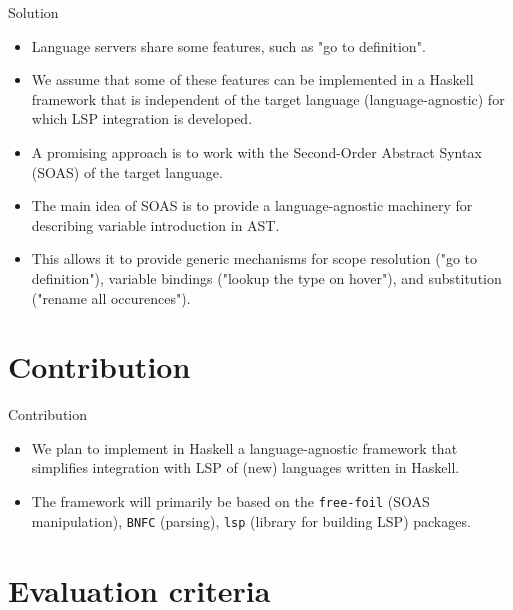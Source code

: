 \documentclass[serif, aspectratio=169]{beamer}
\begin{document}
\begin{frame}{Solution}
    \begin{itemize}
        [<+-| alert+>] %
        \item Language servers share some features, such as "go to definition".
        \item We assume that some of these features can be implemented in a Haskell framework that is independent of the target language (language-agnostic) for which LSP integration is developed.
        \item A promising approach is to work with the Second-Order Abstract Syntax (SOAS) \cite{fiore_formal_2022} of the target language.
        \item The main idea of SOAS is to provide a language-agnostic machinery for describing variable introduction in AST.
        \item This allows it to provide generic mechanisms for scope resolution ("go to definition"), variable bindings ("lookup the type on hover"), and substitution ("rename all occurences").
    \end{itemize}
\end{frame}

\section{Contribution}

\begin{frame}{Contribution}
    \begin{itemize}
        [<+-| alert+>] %
        \item We plan to implement in Haskell a language-agnostic framework that simplifies integration with LSP of (new) languages written in Haskell.
        \item The framework will primarily be based on the \texttt{free-foil} \cite{hackage_free_foil} (SOAS manipulation), \texttt{BNFC} \cite{hackage_bnfc} (parsing), \texttt{lsp} \cite{hackage_lsp} (library for building LSP) packages.
    \end{itemize}
\end{frame}

\section{Evaluation criteria}
\label{sec:evaluation_criteria}
\end{document}
